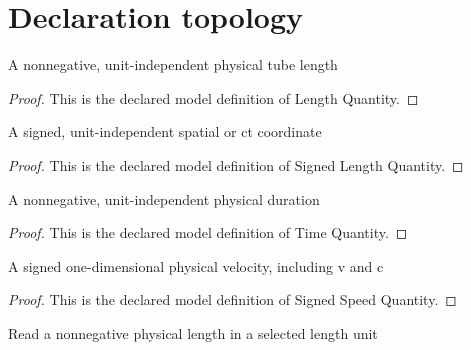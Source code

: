 \section{Declaration topology}
\begin{definition}
  \label{def:physics:phyx-mini-0610:phyxminiproblems-problemphyxmini0610-lengthquantity}
  A nonnegative, unit-independent physical tube length
\end{definition}
\begin{proof}
  This is the declared model definition of Length Quantity.
\end{proof}
\begin{definition}
  \label{def:physics:phyx-mini-0610:phyxminiproblems-problemphyxmini0610-signedlengthquantity}
  A signed, unit-independent spatial or ct coordinate
\end{definition}
\begin{proof}
  This is the declared model definition of Signed Length Quantity.
\end{proof}
\begin{definition}
  \label{def:physics:phyx-mini-0610:phyxminiproblems-problemphyxmini0610-timequantity}
  A nonnegative, unit-independent physical duration
\end{definition}
\begin{proof}
  This is the declared model definition of Time Quantity.
\end{proof}
\begin{definition}
  \label{def:physics:phyx-mini-0610:phyxminiproblems-problemphyxmini0610-signedspeedquantity}
  A signed one-dimensional physical velocity, including v and c
\end{definition}
\begin{proof}
  This is the declared model definition of Signed Speed Quantity.
\end{proof}
\begin{definition}
  \label{def:physics:phyx-mini-0610:phyxminiproblems-problemphyxmini0610-lengthreadout}
  Read a nonnegative physical length in a selected length unit
\end{definition}
